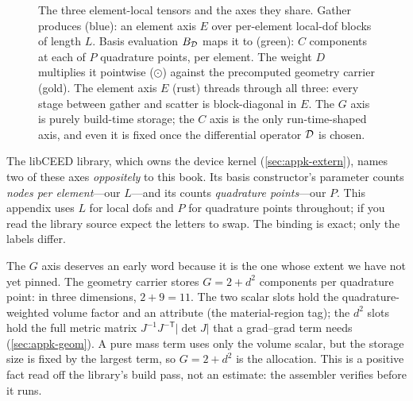 \begin{figure}[t]
\caption[Anatomy of the element-local tensor family]{The three element-local
tensors and the axes they share. Gather produces \code{[(E, L)]} (blue): an
element axis $E$ over per-element local-dof blocks of length $L$. Basis evaluation
$B_{\mathcal{D}}$ maps it to \code{[(E, P, C)]} (green): $C$ components at each of $P$
quadrature points, per element. The weight $D$ multiplies it pointwise ($\odot$)
against the precomputed geometry carrier \code{[(E, P, G)]} (gold). The element
axis $E$ (rust) threads through all three: every stage between gather and scatter
is block-diagonal in $E$. The $G$ axis is purely build-time storage; the $C$ axis
is the only run-time-shaped axis, and even it is fixed once the differential
operator $\mathcal{D}$ is chosen.}
\label{fig:appk-anatomy}
\end{figure}

\begin{notationbox}
The libCEED library, which owns the device kernel (\cref{sec:appk-extern}), names
two of these axes \emph{oppositely} to this book. Its basis constructor's
parameter  counts \emph{nodes per element}---our $L$---and its 
counts \emph{quadrature points}---our $P$. This appendix uses $L$ for local dofs
and $P$ for quadrature points throughout; if you read the library source expect the
letters to swap. The binding is exact; only the labels differ.
\end{notationbox}

The $G$ axis deserves an early word because it is the one whose extent we have not
yet pinned. The geometry carrier stores $G = 2 + d^2$ components per quadrature
point: in three dimensions, $2 + 9 = 11$. The two scalar slots hold the
quadrature-weighted volume factor and an attribute (the material-region tag); the
$d^2$ slots hold the full metric matrix $J^{-1}J^{-\mathsf T}|\det J|$ that a
grad--grad term needs (\cref{sec:appk-geom}). A pure mass term uses only the volume
scalar, but the storage size is fixed by the largest term, so $G=2+d^2$ is the
allocation. This is a positive fact read off the library's build pass, not an
estimate: the assembler verifies 
before it runs.

